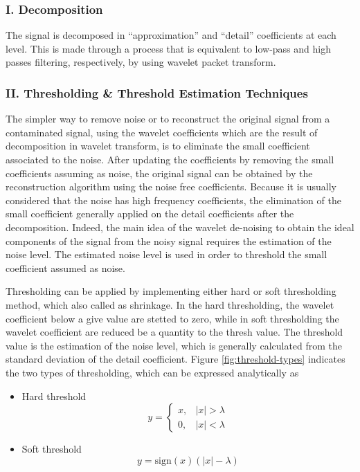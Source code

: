 \documentclass[12pt, a4paper, twoside]{report}
\begin{document}
\subsubsection{I. Decomposition}
The signal is decomposed in ``approximation'' and ``detail'' coefficients at each level. This is made through a process that is equivalent to low-pass and high passes filtering, respectively, by using wavelet packet transform.

\subsubsection{II. Thresholding \& Threshold Estimation Techniques}
The simpler way to remove noise or to reconstruct the original signal from a contaminated signal, using the wavelet coefficients which are the result of decomposition in wavelet transform, is to eliminate the small coefficient associated to the noise. After updating the coefficients by removing the small coefficients assuming as noise, the original signal can be obtained by the reconstruction algorithm using the noise free coefficients. Because it is usually considered that the noise has high frequency coefficients, the elimination of the small coefficient generally applied on the detail coefficients after the decomposition. Indeed, the main idea of the wavelet de-noising to obtain the ideal components of the signal from the noisy signal requires the estimation of the noise level. The estimated noise level is used in order to threshold the small coefficient assumed as noise.

Thresholding can be applied by implementing either hard or soft thresholding method, which also called as shrinkage. In the hard thresholding, the wavelet coefficient below a give value are stetted to zero, while in soft thresholding the wavelet coefficient are reduced be a quantity to the thresh value.  The threshold value is the estimation of the noise level, which is generally calculated from the standard deviation of the detail coefficient. Figure \ref{fig:threshold-types} indicates the two types of thresholding, which can be expressed analytically as
\begin{itemize}
\item Hard threshold
\begin{equation}
y = \begin{cases}
x, & \left | x  \right | > \lambda \\ 
0, & \left | x  \right | < \lambda
\end{cases}
\end{equation}
\item Soft threshold
\begin{equation}
y = \text{sign}(x) \left ( \left | x \right | - \lambda \right )
\end{equation}
\end{itemize}
\end{document}
